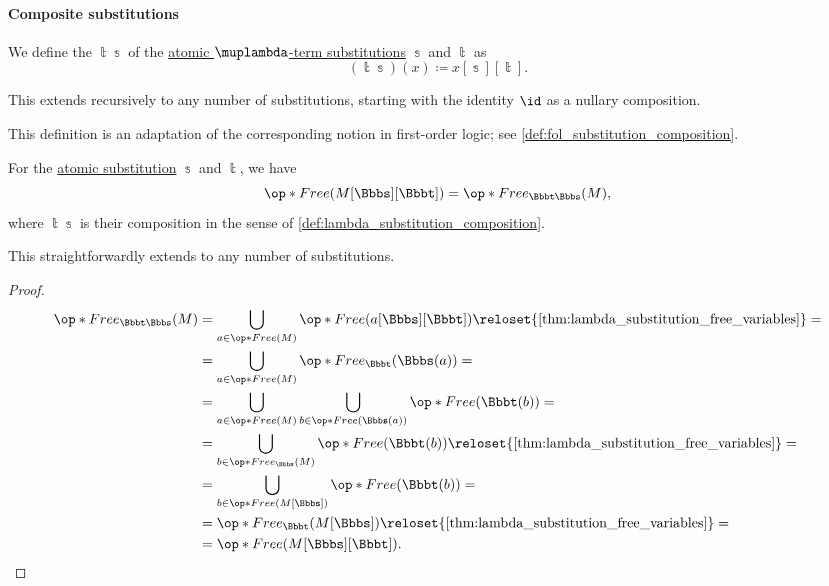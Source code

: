 \paragraph{Composite substitutions}

\begin{definition}\label{def:lambda_substitution_composition}\mimprovised
  We define the  \( \Bbbt\Bbbs \) of the \hyperref[def:atomic_lambda_term_substitution]{atomic \( \muplambda \)-term substitutions} \( \Bbbs \) and \( \Bbbt \) as
  \begin{equation}\label{eq:def:lambda_substitution_composition}
    (\Bbbt\Bbbs)(x) \coloneqq x[\Bbbs][\Bbbt].
  \end{equation}

  This extends recursively to any number of substitutions, starting with the identity \( \id \) as a nullary composition.
\end{definition}
\begin{comments}
  \item This definition is an adaptation of the corresponding notion in first-order logic; see \cref{def:fol_substitution_composition}.
\end{comments}

\begin{lemma}\label{thm:substitution_composition_free_variables}
  For the \hyperref[def:atomic_lambda_term_substitution]{atomic substitution} \( \Bbbs \) and \( \Bbbt \), we have
  \begin{equation}\label{eq:thm:substitution_composition_free_variables}
    \op*{Free}(M[\Bbbs][\Bbbt]) = \op*{Free}_{\Bbbt\Bbbs}(M),
  \end{equation}
  where \( \Bbbt\Bbbs \) is their composition in the sense of \cref{def:lambda_substitution_composition}.

  This straightforwardly extends to any number of substitutions.
\end{lemma}
\begin{proof}
  \begin{align*}
    \op*{Free}_{\Bbbt\Bbbs}(M)
    &=
    \bigcup_{a \in \op*{Free}(M)} \op*{Free}(a[\Bbbs][\Bbbt])
    \reloset {\ref{thm:lambda_substitution_free_variables}} = \\ &=
    \bigcup_{a \in \op*{Free}(M)} \op*{Free}_\Bbbt(\Bbbs(a))
    = \\ &=
    \bigcup_{a \in \op*{Free}(M)} \bigcup_{b \in \op*{Free}(\Bbbs(a))} \op*{Free}(\Bbbt(b))
    = \\ &=
    \bigcup_{b \in \op*{Free}_\Bbbs(M)} \op*{Free}(\Bbbt(b))
    \reloset {\ref{thm:lambda_substitution_free_variables}} = \\ &=
    \bigcup_{b \in \op*{Free}(M[\Bbbs])} \op*{Free}(\Bbbt(b))
    = \\ &=
    \op*{Free}_\Bbbt(M[\Bbbs])
    \reloset {\ref{thm:lambda_substitution_free_variables}} = \\ &=
    \op*{Free}(M[\Bbbs][\Bbbt]).
  \end{align*}
\end{proof}

